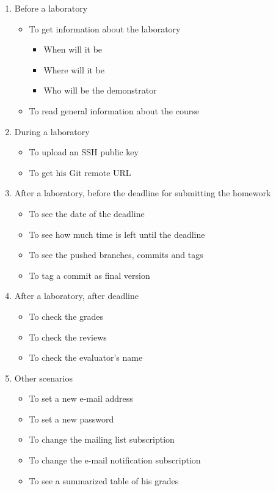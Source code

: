 \begin{enumerate}
	\item Before a laboratory
	\begin{itemize}
		\item To get information about the laboratory
		\begin{itemize}
			\item When will it be
			\item Where will it be
			\item Who will be the demonstrator
		\end{itemize}
		\item To read general information about the course
	\end{itemize}
	
	\item During a laboratory
	\begin{itemize}
		\item To upload an SSH public key
		\item To get his Git remote URL
	\end{itemize}
	
	\item After a laboratory, before the deadline for submitting the homework
	\begin{itemize}
		\item To see the date of the deadline
		\item To see how much time is left until the deadline
		\item To see the pushed branches, commits and tags
		\item To tag a commit as final version
	\end{itemize}
	
	\item After a laboratory, after deadline
	\begin{itemize}
		\item To check the grades
		\item To check the reviews
		\item To check the evaluator's name
	\end{itemize}
	
	\item Other scenarios
	\begin{itemize}
		\item To set a new e-mail address
		\item To set a new password
		\item To change the mailing list subscription
		\item To change the e-mail notification subscription
		\item To see a summarized table of his grades
	\end{itemize}
	
\end{enumerate}

